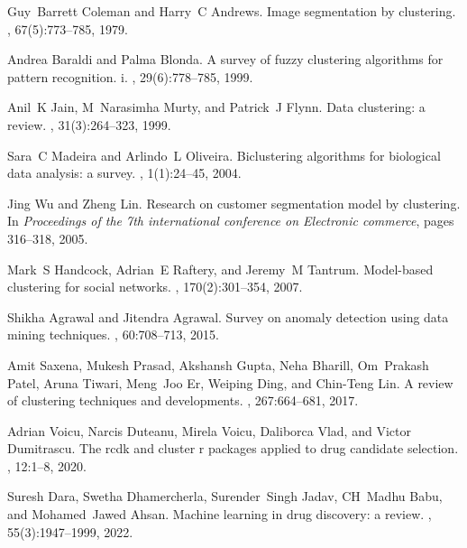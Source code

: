 \documentclass[showpacs,twocolumn,superscriptaddress]{revtex4-2}
\begin{document}
\begin{thebibliography}{10}

Guy~Barrett Coleman and Harry~C Andrews.
\newblock Image segmentation by clustering.
, 67(5):773--785, 1979.

Andrea Baraldi and Palma Blonda.
\newblock A survey of fuzzy clustering algorithms for pattern recognition. i.
, 29(6):778--785, 1999.

Anil~K Jain, M~Narasimha Murty, and Patrick~J Flynn.
\newblock Data clustering: a review.
, 31(3):264--323, 1999.

Sara~C Madeira and Arlindo~L Oliveira.
\newblock Biclustering algorithms for biological data analysis: a survey.
, 1(1):24--45, 2004.

Jing Wu and Zheng Lin.
\newblock Research on customer segmentation model by clustering.
\newblock In {\em Proceedings of the 7th international conference on Electronic
  commerce}, pages 316--318, 2005.

Mark~S Handcock, Adrian~E Raftery, and Jeremy~M Tantrum.
\newblock Model-based clustering for social networks.
, 170(2):301--354, 2007.

Shikha Agrawal and Jitendra Agrawal.
\newblock Survey on anomaly detection using data mining techniques.
, 60:708--713, 2015.

Amit Saxena, Mukesh Prasad, Akshansh Gupta, Neha Bharill, Om~Prakash Patel,
  Aruna Tiwari, Meng~Joo Er, Weiping Ding, and Chin-Teng Lin.
\newblock A review of clustering techniques and developments.
, 267:664--681, 2017.

Adrian Voicu, Narcis Duteanu, Mirela Voicu, Daliborca Vlad, and Victor
  Dumitrascu.
\newblock The rcdk and cluster r packages applied to drug candidate selection.
, 12:1--8, 2020.

Suresh Dara, Swetha Dhamercherla, Surender~Singh Jadav, CH~Madhu Babu, and
  Mohamed~Jawed Ahsan.
\newblock Machine learning in drug discovery: a review.
, 55(3):1947--1999, 2022.


\end{thebibliography}
\end{document}
